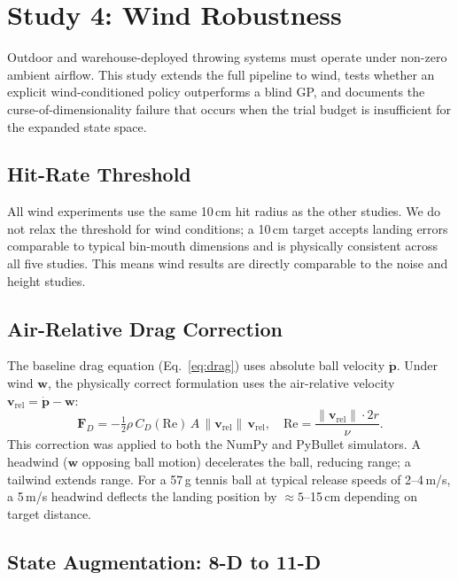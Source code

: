 \section{Study 4: Wind Robustness}
\label{sec:study4}

Outdoor and warehouse-deployed throwing systems must operate under non-zero ambient
airflow.
This study extends the full \mcpilot{} pipeline to wind, tests whether an explicit
wind-conditioned policy outperforms a blind GP, and documents the curse-of-dimensionality
failure that occurs when the trial budget is insufficient for the expanded state space.

\subsection{Hit-Rate Threshold}
\label{sec:study4:threshold}

All wind experiments use the same 10\,cm hit radius as the other studies.
We do not relax the threshold for wind conditions; a 10\,cm target accepts landing
errors comparable to typical bin-mouth dimensions and is physically consistent
across all five studies.
This means wind results are directly comparable to the noise and height studies.

\subsection{Air-Relative Drag Correction}
\label{sec:study4:physics}

The baseline drag equation (Eq.~\ref{eq:drag}) uses absolute ball velocity
$\dot{\mathbf{p}}$.
Under wind $\mathbf{w}$, the physically correct formulation uses the air-relative
velocity $\mathbf{v}_{\mathrm{rel}} = \dot{\mathbf{p}} - \mathbf{w}$:
\begin{equation}
  \mathbf{F}_D = -\tfrac{1}{2}\rho\, C_D(\mathrm{Re})\, A\,
    \|\mathbf{v}_{\mathrm{rel}}\|\, \mathbf{v}_{\mathrm{rel}}, \quad
  \mathrm{Re} = \frac{\|\mathbf{v}_{\mathrm{rel}}\| \cdot 2r}{\nu}.
  \label{eq:wind_drag}
\end{equation}
This correction was applied to both the NumPy and PyBullet simulators.
A headwind ($\mathbf{w}$ opposing ball motion) decelerates the ball, reducing range;
a tailwind extends range.
For a 57\,g tennis ball at typical release speeds of 2--4\,m/s, a 5\,m/s headwind
deflects the landing position by $\approx 5$--15\,cm depending on target distance.

\subsection{State Augmentation: 8-D to 11-D}
\label{sec:study4:state}

